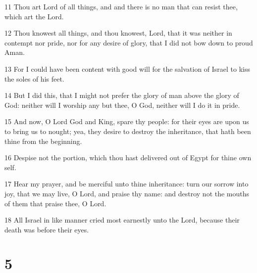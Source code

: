 \par 11 Thou art Lord of all things, and and there is no man that can resist thee, which art the Lord.
\par 12 Thou knowest all things, and thou knowest, Lord, that it was neither in contempt nor pride, nor for any desire of glory, that I did not bow down to proud Aman.
\par 13 For I could have been content with good will for the salvation of Israel to kiss the soles of his feet.
\par 14 But I did this, that I might not prefer the glory of man above the glory of God: neither will I worship any but thee, O God, neither will I do it in pride.
\par 15 And now, O Lord God and King, spare thy people: for their eyes are upon us to bring us to nought; yea, they desire to destroy the inheritance, that hath been thine from the beginning.
\par 16 Despise not the portion, which thou hast delivered out of Egypt for thine own self.
\par 17 Hear my prayer, and be merciful unto thine inheritance: turn our sorrow into joy, that we may live, O Lord, and praise thy name: and destroy not the mouths of them that praise thee, O Lord.
\par 18 All Israel in like manner cried most earnestly unto the Lord, because their death was before their eyes.

\chapter{5}

